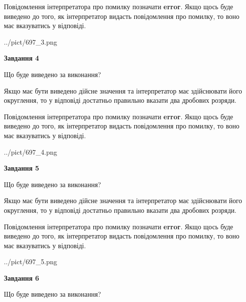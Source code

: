 \documentclass[12pt, ukrainian]{article}
\begin{document}
{\begin {Large}
Повідомлення інтерпретатора про помилку позначати \textbf{error}.
Якщо щось буде виведено до того, як інтерпретатор видасть повідомлення про помилку, 
то воно має вказуватись у відповіді. \par

\begin{center}
	{../pict/697_3.png}
\end{center}
\newpage

{\begin {center}\textbf{Завдання 4}\end {center}}\par
Що буде виведено за виконання? \par

Якщо має бути виведено дійсне значення та інтерпретатор має здійснювати його округлення, 
то у відповіді достатньо правильно вказати два дробових розряди.

Повідомлення інтерпретатора про помилку позначати \textbf{error}.
Якщо щось буде виведено до того, як інтерпретатор видасть повідомлення про помилку, 
то воно має вказуватись у відповіді. \par

\begin{center}
	{../pict/697_4.png}
\end{center}
\newpage

{\begin {center}\textbf{Завдання 5}\end {center}}\par
Що буде виведено за виконання? \par

Якщо має бути виведено дійсне значення та інтерпретатор має здійснювати його округлення, 
то у відповіді достатньо правильно вказати два дробових розряди.

Повідомлення інтерпретатора про помилку позначати \textbf{error}.
Якщо щось буде виведено до того, як інтерпретатор видасть повідомлення про помилку, 
то воно має вказуватись у відповіді. \par

\begin{center}
	{../pict/697_5.png}
\end{center}
\newpage

{\begin {center}\textbf{Завдання 6}\end {center}}\par
Що буде виведено за виконання? \par


\end{Large}}
\end{document}
